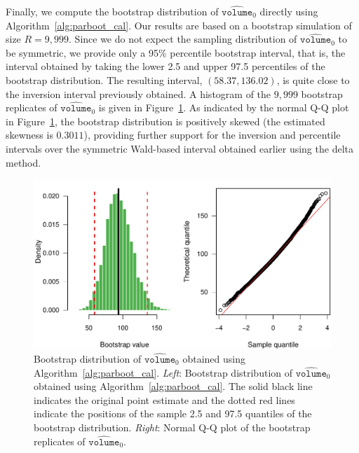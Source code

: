 \documentclass[cmfont,usenames,dvipsnames,leqno]{afit-etd}\usepackage[]{graphicx}\usepackage[]{color}
\makeatletter
\def\maxwidth{ %
  \ifdim\Gin@nat@width>\linewidth
    \linewidth
  \else
    \Gin@nat@width
  \fi
}
\newenvironment{knitrout}{}{} %
\renewenvironment{knitrout}{\begin{singlespace}}{\end{singlespace}}
\newcommand{\wh}[1]{\ensuremath{\widehat{#1}}}
\makeatother
\begin{document}
Finally, we compute the bootstrap distribution of $\wh{\texttt{volume}}_0$ directly using Algorithm~\ref{alg:parboot_cal}. Our results are based on a bootstrap simulation of size $R = 9,999$. Since we do not expect the sampling distribution of $\wh{\texttt{volume}}_0$ to be symmetric, we provide only a 95\% percentile bootstrap interval, that is, the interval obtained by taking the lower 2.5 and upper 97.5 percentiles of the bootstrap distribution. The resulting interval, $(58.37, 136.02)$, is quite close to the inversion interval previously obtained. A histogram of the $9,999$ bootstrap replicates of $\wh{\texttt{volume}}_0$ is given in Figure~\ref{fig:bladder-parboot-hist2}. As indicated by the normal Q-Q plot in Figure~\ref{fig:bladder-parboot-hist2}, the bootstrap distribution is positively skewed (the estimated skewness is $0.3011$), providing further support for the inversion and percentile intervals over the symmetric Wald-based interval obtained earlier using the delta method. 

\begin{knitrout}
\color{fgcolor}\begin{figure}[H]

\includegraphics[width=\maxwidth]{figure/bladder-parboot-hist2} \caption[Bootstrap distribution of $\wh{\texttt{volume}}_0$ obtained using Algorithm~\ref{alg:parboot_cal}]{Bootstrap distribution of $\wh{\texttt{volume}}_0$ obtained using Algorithm~\ref{alg:parboot_cal}. \textit{Left}: Bootstrap distribution of $\wh{\texttt{volume}}_0$ obtained using Algorithm~\ref{alg:parboot_cal}. The solid black line indicates the original point estimate and the dotted red lines indicate the positions of the sample 2.5 and 97.5 quantiles of the bootstrap distribution. \textit{Right}: Normal Q-Q plot of the bootstrap replicates of $\wh{\texttt{volume}}_0$.\label{fig:bladder-parboot-hist2}}
\end{figure}


\end{knitrout}
\end{document}
